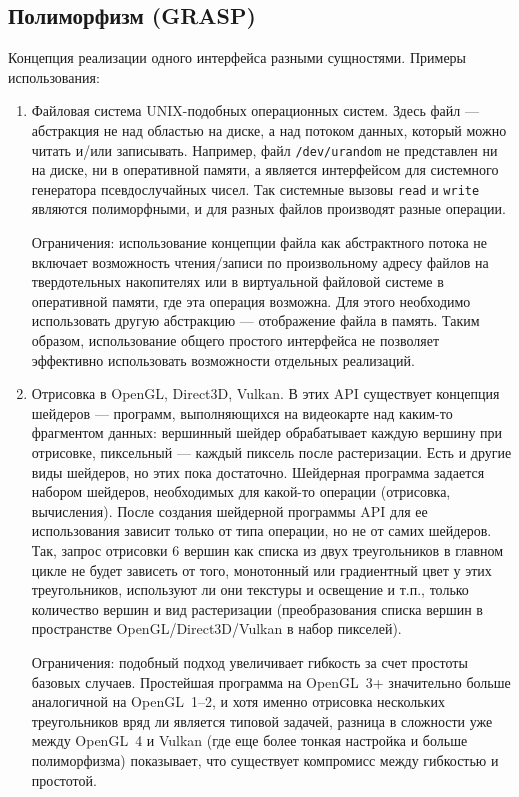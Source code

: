 \subsection*{Полиморфизм (GRASP)}
Концепция реализации одного интерфейса разными сущностями.
Примеры использования:
\begin{enumerate}
    \item Файловая система UNIX-подобных операционных систем.
    Здесь файл --- абстракция не над областью на диске, а над потоком данных, который можно читать и/или записывать.
    Например, файл \verb|/dev/urandom| не представлен ни на диске, ни в оперативной памяти,
    а является интерфейсом для системного генератора псевдослучайных чисел.
    Так системные вызовы \verb|read| и \verb|write| являются полиморфными,
    и для разных файлов производят разные операции.

    Ограничения: использование концепции файла как абстрактного потока не включает возможность
    чтения/записи по произвольному адресу файлов на твердотельных накопителях или
    в виртуальной файловой системе в оперативной памяти, где эта операция возможна.
    Для этого необходимо использовать другую абстракцию --- отображение файла в память.
    Таким образом, использование общего простого интерфейса не позволяет эффективно использовать
    возможности отдельных реализаций.

    \item Отрисовка в OpenGL, Direct3D, Vulkan.
    В этих API существует концепция шейдеров --- программ, выполняющихся на видеокарте над каким-то фрагментом данных:
    вершинный шейдер обрабатывает каждую вершину при отрисовке, пиксельный --- каждый пиксель после растеризации.
    Есть и другие виды шейдеров, но этих пока достаточно.
    Шейдерная программа задается набором шейдеров, необходимых для какой-то операции (отрисовка, вычисления).
    После создания шейдерной программы API для ее использования зависит только от типа операции,
    но не от самих шейдеров.
    Так, запрос отрисовки 6 вершин как списка из двух треугольников в главном цикле
    не будет зависеть от того, монотонный или градиентный цвет у этих треугольников,
    используют ли они текстуры и освещение и т.п., только количество вершин и вид растеризации
    (преобразования списка вершин в пространстве OpenGL/Direct3D/Vulkan в набор пикселей).

    Ограничения: подобный подход увеличивает гибкость за счет простоты базовых случаев.
    Простейшая программа на OpenGL~3+ значительно больше аналогичной на OpenGL~1--2,
    и хотя именно отрисовка нескольких треугольников вряд ли является типовой задачей,
    разница в сложности уже между OpenGL~4 и Vulkan
    (где еще более тонкая настройка и больше полиморфизма)
    показывает, что существует компромисс между гибкостью и простотой.
\end{enumerate}
